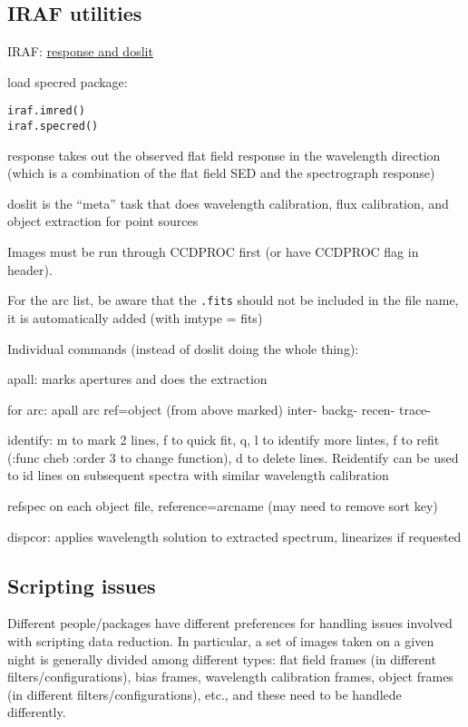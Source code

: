 \documentclass{article}
\begin{document}
\subsection*{IRAF utilities}
IRAF: \href{http://iraf.noao.edu/iraf/web/tutorials/doslit/doslit.html}
        {response and doslit}
\begin{itemize*}
    \item load specred package:
        \begin{verbatim}
iraf.imred()
iraf.specred()
        \end{verbatim}
    \item response takes out the observed flat field response in the
        wavelength direction (which is a combination of the flat field
        SED and the spectrograph response)
    \item doslit is the ``meta'' task that does wavelength calibration,
        flux calibration, and object extraction for point sources
        \begin{itemize*}
            \item Images must be run through CCDPROC first
                (or have CCDPROC flag in header).
            \item For the arc list, be aware that the \verb|.fits|
                should not be included in the file name, it is
                automatically added (with imtype = fits)
        \end{itemize*}
\end{itemize*}

Individual commands (instead of doslit doing the whole thing):
\begin{itemize*}
    \item apall: marks apertures and does the extraction
    \item for arc: apall arc ref=object (from above marked) inter-
        backg- recen- trace-
    \item identify: m to mark 2 lines, f to quick fit, q, l to identify
        more lintes, f to refit (:func cheb :order 3 to change
        function), d to delete lines.
        Reidentify can be used to id lines on subsequent spectra with
        similar wavelength calibration
    \item refspec on each object file, reference=arcname (may need to
        remove sort key)
    \item dispcor: applies wavelength solution to extracted spectrum,
        linearizes if requested
\end{itemize*}
\subsection*{Scripting issues}
Different people/packages have different preferences for handling
issues involved with scripting data reduction. In particular, a set of
images taken on a given night is generally divided among different
types: flat field frames (in different filters/configurations), bias
frames, wavelength calibration frames, object frames (in different
filters/configurations), etc., and these need to be handlede
differently.
\end{document}
